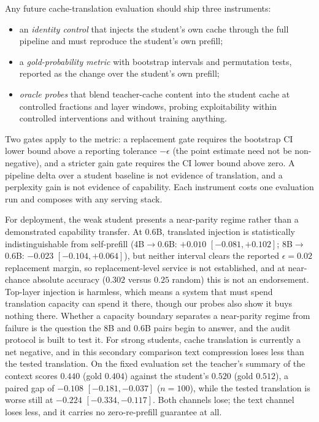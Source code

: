 \documentclass[10pt]{article}
\begin{document}
Any future cache-translation evaluation should ship three instruments:
\begin{itemize}
\item an \emph{identity control} that injects the student's own cache through
the full pipeline and must reproduce the student's own prefill;
\item a \emph{gold-probability metric} with bootstrap intervals and
permutation tests, reported as the change over the student's own prefill;
\item \emph{oracle probes} that blend teacher-cache content into the student
cache at controlled fractions and layer windows, probing exploitability within
controlled interventions and without training anything.
\end{itemize}
Two gates apply to the metric: a replacement gate requires the bootstrap CI
lower bound above a reporting tolerance $-\epsilon$ (the point estimate
need not be non-negative), and a stricter
gain gate requires the CI lower bound above zero. A pipeline delta over a
student baseline is not evidence of translation, and a perplexity gain is not
evidence of capability. Each instrument costs one evaluation run and composes
with any serving stack.

For deployment, the weak student presents a near-parity regime rather than a
demonstrated capability transfer. At 0.6B, translated injection is
statistically indistinguishable from self-prefill
(4B$\to$0.6B: $+0.010$ $[-0.081,+0.102]$; 8B$\to$0.6B: $-0.023$
$[-0.104,+0.064]$), but neither interval clears the reported $\epsilon{=}0.02$ replacement margin, so replacement-level service is not established, and
at near-chance absolute accuracy ($0.302$ versus $0.25$ random) this is not an
endorsement. Top-layer injection is harmless, which means a system that
must spend translation capacity can spend it there, though our probes also
show it buys nothing there. Whether a capacity boundary separates a
near-parity regime from failure is the question the 8B
and 0.6B pairs begin to answer, and the audit protocol is built to test it.
For strong students, cache translation is currently a net negative, and in this
secondary comparison text compression loses less than the tested translation.
On the fixed evaluation set the teacher's summary of the context scores $0.440$
(gold $0.404$) against the student's $0.520$ (gold $0.512$), a paired gap of
$-0.108$ $[-0.181, -0.037]$ ($n{=}100$), while the tested translation is worse
still at $-0.224$ $[-0.334, -0.117]$. Both channels lose; the text channel loses
less, and it carries no zero-re-prefill guarantee at all.
\end{document}
